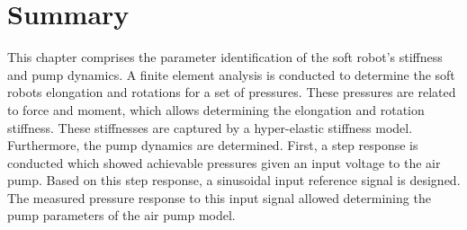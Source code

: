 \section*{Summary} 

This chapter comprises the parameter identification of the soft robot's stiffness and pump dynamics. A finite element analysis is conducted to determine the soft robots elongation and rotations for a set of pressures. These pressures are related to force and moment, which allows determining the elongation and rotation stiffness. These stiffnesses are captured by a hyper-elastic stiffness model. Furthermore, the pump dynamics are determined. First, a step response is conducted which showed achievable pressures given an input voltage to the air pump. Based on this step response, a sinusoidal input reference signal is designed. The measured pressure response to this input signal allowed determining the pump parameters of the air pump model. 

